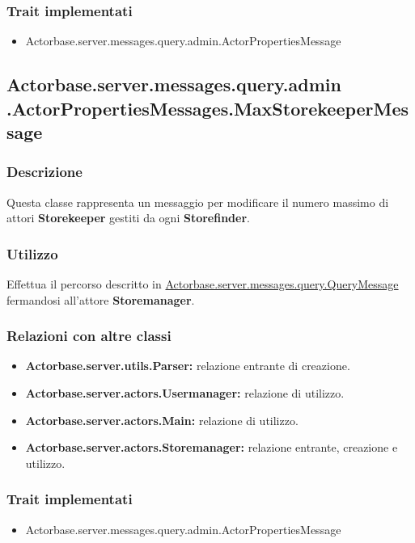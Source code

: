 \documentclass[a4paper]{article}
\begin{document}
			\subsubsection{Trait implementati}
				\begin{itemize}
					\item Actorbase.server.messages.query.admin.ActorPropertiesMessage
				\end{itemize}
		
		\subsection{Actorbase.server.messages.query.admin \newline
		.ActorPropertiesMessages.MaxStorekeeperMessage}
			\subsubsection{Descrizione}
				Questa classe rappresenta un messaggio per modificare il numero massimo di attori \textbf{Storekeeper} gestiti da ogni \textbf{Storefinder}.
				
			\subsubsection{Utilizzo}
				Effettua il percorso descritto in \hyperref[QueryMessage]{Actorbase.server.messages.query.QueryMessage} fermandosi all'attore 
				\textbf{Storemanager}.
				
			\subsubsection{Relazioni con altre classi}
				\begin{itemize}
					\item \textbf{Actorbase.server.utils.Parser:} relazione entrante di creazione.
					\item \textbf{Actorbase.server.actors.Usermanager:} relazione di utilizzo.
					\item \textbf{Actorbase.server.actors.Main:} relazione di utilizzo.
					\item \textbf{Actorbase.server.actors.Storemanager:} relazione entrante, creazione e utilizzo.
				\end{itemize}
			\subsubsection{Trait implementati}
				\begin{itemize}
					\item Actorbase.server.messages.query.admin.ActorPropertiesMessage
				\end{itemize}
				
\end{document}
